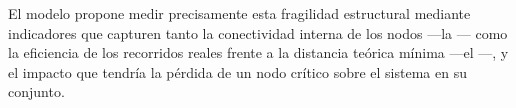 El modelo propone medir precisamente esta fragilidad estructural mediante
indicadores que capturen tanto la conectividad interna de los nodos —la
— como la eficiencia de los recorridos reales frente a
la distancia teórica mínima —el —, y el impacto
que tendría la pérdida de un nodo crítico sobre el sistema en su conjunto.
